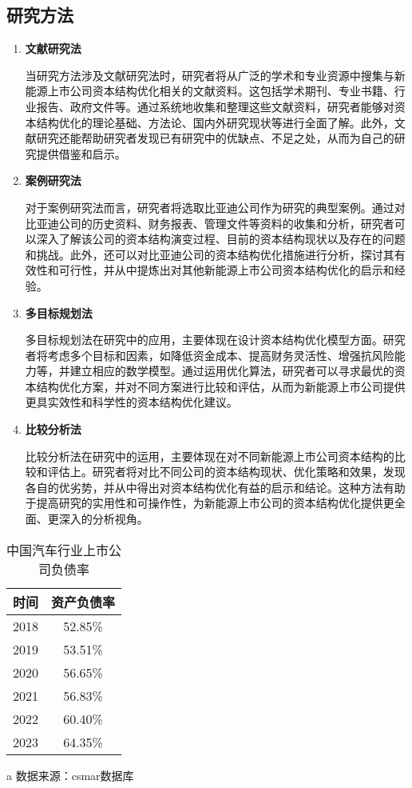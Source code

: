 \subsection{研究方法}
\begin{enumerate}[label=(\arabic*)]
\item \textbf{文献研究法}

当研究方法涉及文献研究法时，研究者将从广泛的学术和专业资源中搜集与新能源上市公司资本结构优化相关的文献资料。这包括学术期刊、专业书籍、行业报告、政府文件等。通过系统地收集和整理这些文献资料，研究者能够对资本结构优化的理论基础、方法论、国内外研究现状等进行全面了解。此外，文献研究还能帮助研究者发现已有研究中的优缺点、不足之处，从而为自己的研究提供借鉴和启示。
\item \textbf{案例研究法}

对于案例研究法而言，研究者将选取比亚迪公司作为研究的典型案例。通过对比亚迪公司的历史资料、财务报表、管理文件等资料的收集和分析，研究者可以深入了解该公司的资本结构演变过程、目前的资本结构现状以及存在的问题和挑战。此外，还可以对比亚迪公司的资本结构优化措施进行分析，探讨其有效性和可行性，并从中提炼出对其他新能源上市公司资本结构优化的启示和经验。
\item \textbf{多目标规划法}

多目标规划法在研究中的应用，主要体现在设计资本结构优化模型方面。研究者将考虑多个目标和因素，如降低资金成本、提高财务灵活性、增强抗风险能力等，并建立相应的数学模型。通过运用优化算法，研究者可以寻求最优的资本结构优化方案，并对不同方案进行比较和评估，从而为新能源上市公司提供更具实效性和科学性的资本结构优化建议。
\item \textbf{比较分析法}

比较分析法在研究中的运用，主要体现在对不同新能源上市公司资本结构的比较和评估上。研究者将对比不同公司的资本结构现状、优化策略和效果，发现各自的优劣势，并从中得出对资本结构优化有益的启示和结论。这种方法有助于提高研究的实用性和可操作性，为新能源上市公司的资本结构优化提供更全面、更深入的分析视角。
\end{enumerate}

\begin{table}
  \centering
  \begin{threeparttable}[c]
    \caption{中国汽车行业上市公司负债率}
    \label{tab:rates}
    \begin{tabular}{cc}
      \toprule
      时间    & 资产负债率   \\
      \midrule
        2018 & 52.85\% \\ 
        2019 & 53.51\% \\ 
        2020 & 56.65\% \\ 
        2021 & 56.83\% \\ 
        2022 & 60.40\% \\ 
        2023 & 64.35\% \\ 
      \bottomrule
    \end{tabular}
    \begin{tablenotes}
      \item [a] 数据来源：csmar数据库
    \end{tablenotes}
  \end{threeparttable}
\end{table}


